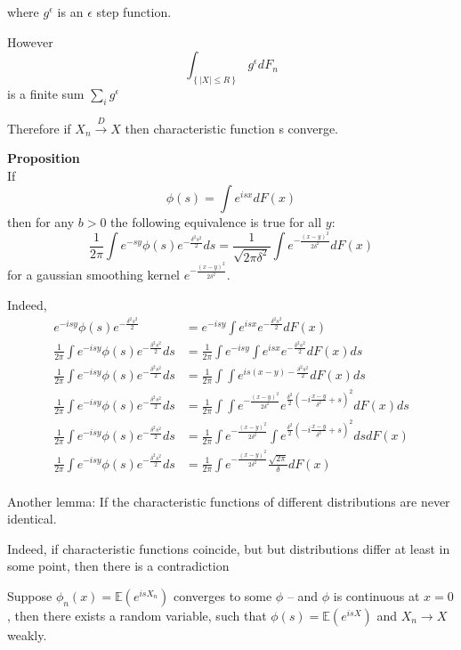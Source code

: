\documentclass[a4paper]{article}
\newcommand{\obj}[1]{{\left\{ #1 \right \}}}
\newcommand{\brac}[1]{{\left ( #1 \right )}}
\newcommand{\abs}[1]{{\left | #1 \right |}}
\newcommand{\Ex}{\mathbb{E}}
\begin{document}
where $g^\epsilon$ is an $\epsilon$ step function.

However
\[\int_\obj{\abs{X}\leq R} g^\epsilon dF_n\]
is a finite sum $\sum_i g^\epsilon$

Therefore if $X_n\overset{D}{\to} X$ then characteristic function s converge.



\noindent\textbf{Proposition} \hfill\\
If
\[\phi(s) = \int e^{isx} dF(x)\]
then for any $b>0$ the following equivalence is true for all $y$:
\[\frac{1}{2\pi}\int e^{-sy} \phi(s) e^{-\frac{\delta^2 s^2}{2}}ds
=\frac{1}{\sqrt{2\pi\delta^2}}\int e^{-\frac{{(x-y)}^2}{2\delta^2}}dF(x)\]
for a gaussian smoothing kernel $e^{-\frac{{(x-y)}^2}{2\delta^2}}$.

Indeed, \begin{align*}
	e^{-isy}\phi(s)e^{-\frac{\delta^2 s^2}{2}} &= e^{-isy}\int e^{isx} e^{-\frac{\delta^2 s^2}{2}} dF(x)\\
	\frac{1}{2\pi}\int e^{-isy}\phi(s)e^{-\frac{\delta^2 s^2}{2}} ds &= \frac{1}{2\pi}\int e^{-isy}\int e^{isx} e^{-\frac{\delta^2 s^2}{2}} dF(x) ds\\
	\frac{1}{2\pi}\int e^{-isy}\phi(s)e^{-\frac{\delta^2 s^2}{2}} ds &= \frac{1}{2\pi}\int \int e^{is(x-y)-\frac{\delta^2 s^2}{2}} dF(x) ds\\
	\frac{1}{2\pi}\int e^{-isy}\phi(s)e^{-\frac{\delta^2 s^2}{2}} ds &= \frac{1}{2\pi}\int \int e^{-\frac{{(x-y)}^2}{2\delta^2}} e^{\frac{\delta^2}{2}\brac{-i\frac{x-y}{\delta^2}+s}^2} dF(x) ds\\
	\frac{1}{2\pi}\int e^{-isy}\phi(s)e^{-\frac{\delta^2 s^2}{2}} ds &= \frac{1}{2\pi}\int e^{-\frac{{(x-y)}^2}{2\delta^2}} \int e^{\frac{\delta^2}{2}\brac{-i\frac{x-y}{\delta^2}+s}^2} ds dF(x)\\
	\frac{1}{2\pi}\int e^{-isy}\phi(s)e^{-\frac{\delta^2 s^2}{2}} ds &= \frac{1}{2\pi}\int e^{-\frac{{(x-y)}^2}{2\delta^2}} \frac{\sqrt{2\pi}}{\delta} dF(x)\\
\end{align*}


Another lemma:
If the characteristic functions of different distributions are never identical.

Indeed, if characteristic functions coincide, but but distributions differ at least in some point, then there is a contradiction

Suppose $\phi_n(x) = \Ex\brac{e^{isX_n}}$ converges to some $\phi$ -- and $\phi$ is continuous at $x=0$, then there exists a random variable, such that $\phi(s) = \Ex\brac{e^{isX}}$ and $X_n\to X$ weakly.
\end{document}
